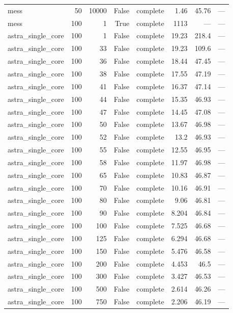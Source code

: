 \begin{tabular}{lrrrlrrl}
mess & 50 & 10000 & False & complete & 1.46 & 45.76 & — \\
mess & 100 & 1 & True & complete & 1113 & — & — \\
astra\_single\_core & 100 & 1 & False & complete & 19.23 & 218.4 & — \\
astra\_single\_core & 100 & 33 & False & complete & 19.23 & 109.6 & — \\
astra\_single\_core & 100 & 36 & False & complete & 18.44 & 47.45 & — \\
astra\_single\_core & 100 & 38 & False & complete & 17.55 & 47.19 & — \\
astra\_single\_core & 100 & 41 & False & complete & 16.37 & 47.14 & — \\
astra\_single\_core & 100 & 44 & False & complete & 15.35 & 46.93 & — \\
astra\_single\_core & 100 & 47 & False & complete & 14.45 & 47.08 & — \\
astra\_single\_core & 100 & 50 & False & complete & 13.67 & 46.98 & — \\
astra\_single\_core & 100 & 52 & False & complete & 13.2 & 46.93 & — \\
astra\_single\_core & 100 & 55 & False & complete & 12.55 & 46.95 & — \\
astra\_single\_core & 100 & 58 & False & complete & 11.97 & 46.98 & — \\
astra\_single\_core & 100 & 65 & False & complete & 10.83 & 46.87 & — \\
astra\_single\_core & 100 & 70 & False & complete & 10.16 & 46.91 & — \\
astra\_single\_core & 100 & 80 & False & complete & 9.06 & 46.81 & — \\
astra\_single\_core & 100 & 90 & False & complete & 8.204 & 46.84 & — \\
astra\_single\_core & 100 & 100 & False & complete & 7.525 & 46.68 & — \\
astra\_single\_core & 100 & 125 & False & complete & 6.294 & 46.68 & — \\
astra\_single\_core & 100 & 150 & False & complete & 5.476 & 46.58 & — \\
astra\_single\_core & 100 & 200 & False & complete & 4.453 & 46.5 & — \\
astra\_single\_core & 100 & 300 & False & complete & 3.427 & 46.53 & — \\
astra\_single\_core & 100 & 500 & False & complete & 2.614 & 46.26 & — \\
astra\_single\_core & 100 & 750 & False & complete & 2.206 & 46.19 & — \\

\end{tabular}
